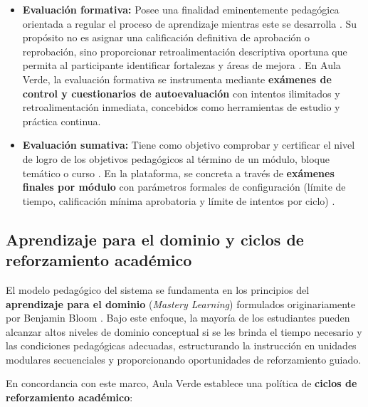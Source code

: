 \begin{itemize}
    \item \textbf{Evaluación formativa:} Posee una finalidad eminentemente pedagógica orientada a regular el proceso de aprendizaje mientras este se desarrolla \cite{black1998assessment}. Su propósito no es asignar una calificación definitiva de aprobación o reprobación, sino proporcionar retroalimentación descriptiva oportuna que permita al participante identificar fortalezas y áreas de mejora \cite{hattie2007feedback}. En Aula Verde, la evaluación formativa se instrumenta mediante \textbf{exámenes de control y cuestionarios de autoevaluación} con intentos ilimitados y retroalimentación inmediata, concebidos como herramientas de estudio y práctica continua.
    \item \textbf{Evaluación sumativa:} Tiene como objetivo comprobar y certificar el nivel de logro de los objetivos pedagógicos al término de un módulo, bloque temático o curso \cite{bloom1968mastery}. En la plataforma, se concreta a través de \textbf{exámenes finales por módulo} con parámetros formales de configuración (límite de tiempo, calificación mínima aprobatoria y límite de intentos por ciclo) \cite{moodle2026quizsettings}.
\end{itemize}

\subsection{Aprendizaje para el dominio y ciclos de reforzamiento académico}

El modelo pedagógico del sistema se fundamenta en los principios del \textbf{aprendizaje para el dominio} (\textit{Mastery Learning}) formulados originariamente por Benjamin Bloom \cite{bloom1968mastery}. Bajo este enfoque, la mayoría de los estudiantes pueden alcanzar altos niveles de dominio conceptual si se les brinda el tiempo necesario y las condiciones pedagógicas adecuadas, estructurando la instrucción en unidades modulares secuenciales y proporcionando oportunidades de reforzamiento guiado.

En concordancia con este marco, Aula Verde establece una política de \textbf{ciclos de reforzamiento académico}:

